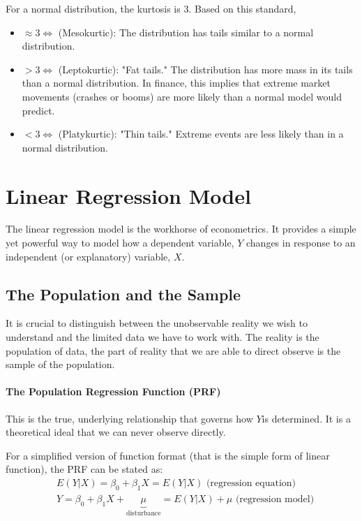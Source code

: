 \documentclass{article}
\begin{document}
For a normal distribution, the kurtosis is 3. Based on this standard,
\begin{itemize}
  \item $\approx 3 \iff$ (Mesokurtic): The distribution has tails similar to a normal distribution.
  \item $>3 \iff$ (Leptokurtic): "Fat tails." The distribution has more mass in its tails than a normal distribution. In finance, this implies that extreme market movements (crashes or booms) are more likely than a normal model would predict.
  
  \item $<3 \iff$ (Platykurtic): "Thin tails." Extreme events are less likely than in a normal distribution.
\end{itemize}


\section{Linear Regression Model}

The linear regression model is the workhorse of econometrics. It provides a simple yet powerful way to model how a dependent variable, $Y$ changes in response to an independent (or explanatory) variable, $X$.

\subsection{The Population and the Sample}

It is crucial to distinguish between the unobservable reality we wish to understand and the limited data we have to work with. The reality is the population of data, the part of reality that we are able to direct observe is the sample of the population.


\paragraph{The Population Regression Function (PRF)}
This is the true, underlying relationship that governs how $Y$is determined. It is a theoretical ideal that we can never observe directly.


For a simplified version of function format (that is the simple form of linear function), the PRF can be stated as:
\begin{align}
& E(Y|X)=\beta_{0}+\beta_{1} X =E(Y|X) \text{ (regression equation)}
\\& Y= \beta_{0}+\beta_{1}X+\underbrace{\mu}_\text{disturbance}=E(Y|X)+\mu \text{ (regression model)}
\end{align}
\end{document}
